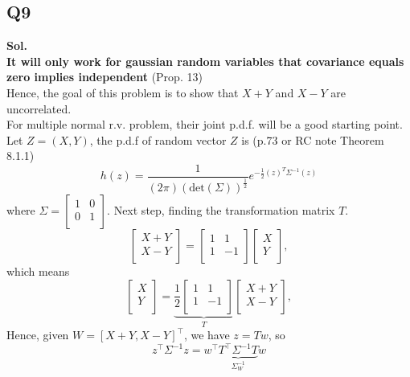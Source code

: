 \documentclass[12pt]{article}
\begin{document}
\subsection*{Q9}
\textbf{Sol.} \\
\textbf{It will only work for gaussian random variables that covariance equals zero implies independent} (Prop. 13)\\  
Hence, the goal of this problem is to show that \(X+Y\) and \(X-Y\) are uncorrelated.\\
For multiple normal r.v. problem, their joint p.d.f. will be a good starting point. 
Let \(Z = (X,Y)\), the p.d.f of random vector \(Z\) is (p.73 or RC note Theorem 8.1.1) 
\[
   h(z) = \frac{1}{(2\pi) (\text{det}(\Sigma) )^{\frac{1}{2}}} e^{-\frac{1}{2} (z)^T \Sigma ^{-1} (z) }
\]  
where \(\Sigma  = \begin{bmatrix}
   1 &  0 \\
   0 &  1 \\
\end{bmatrix}\). 
Next step, finding the transformation matrix \(T\). 
\[
   \begin{bmatrix}
       X+Y \\
       X-Y \\
   \end{bmatrix} = \begin{bmatrix}
      1 &  1 \\
      1 &  -1 \\
   \end{bmatrix} \begin{bmatrix}
       X \\
       Y \\
   \end{bmatrix}, 
\]  
which means 
\[
   \begin{bmatrix}
       X \\
       Y \\
   \end{bmatrix} = \underbrace{\frac{1}{2} \begin{bmatrix}
      1 &  1 \\
      1 &  -1 \\
   \end{bmatrix}}_{T} \begin{bmatrix}
       X+Y \\
       X-Y \\
   \end{bmatrix}, 
\] 
Hence, given \(W = [X+Y,X-Y]^{\top} \), we have \(z = Tw\), so 
\[
   z^{\top} \Sigma^{-1} z = w^{\top} \underbrace{T^{\top} \Sigma^{-1} T}_{\Sigma_W^{-1}} w
\]
\end{document}
